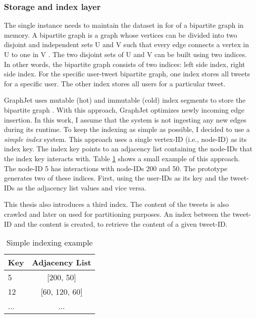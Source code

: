 
\subsubsection{Storage and index layer}
\label{subsub:storage-index-layer}
The single instance needs to maintain the dataset in for of a bipartite graph in memory. A bipartite graph is a graph whose vertices can be divided into two disjoint and independent sets U and V such that every edge connects a vertex in U to one in V \cite{skienaImplementingDiscreteMathematics1991}. The two disjoint sets of U and V can be built using two indices. In other words, the bipartite graph consists of two indices: left side index, right side index. For the specific user-tweet bipartite graph, one index stores all tweets for a specific user. The other index stores all users for a particular tweet.


GraphJet uses mutable (hot) and immutable (cold) index segments to store the bipartite graph \cite{sharmaGraphJetRealtimeContent2016}. With this approach, GraphJet optimizes newly incoming edge insertion. In this work, I assume that the system is not ingesting any new edges during its runtime. To keep the indexing as simple as possible, I decided to use a \emph{simple index} system. This approach uses a single vertex-ID (i.e., node-ID) as its index key. The index key points to an adjacency list containing the node-IDs that the index key interacts with. Table \ref{tab:simple-indexing} shows a small example of this approach. The node-ID 5 has interactions with node-IDs 200 and 50. The prototype generates two of these indices. First, using the user-IDs as its key and the tweet-IDs as the adjacency list values and vice versa.


This thesis also introduces a third index. The content of the tweets is also crawled and later on used for partitioning purposes. An index between the tweet-ID and the content is created, to retrieve the content of a given tweet-ID.

\begin{table}[!h]
    \centering
    \caption{Simple indexing example}
    \label{tab:simple-indexing}
    \begin{tabular}{|l|c|}
        \hline
        \textbf{Key} & \textbf{Adjacency List} \\
        \hline
        5 & [200, 50] \\
        \hline
        12 & [60, 120, 60] \\
        \hline
        ... & ... \\
        \hline
    \end{tabular}
\end{table}


